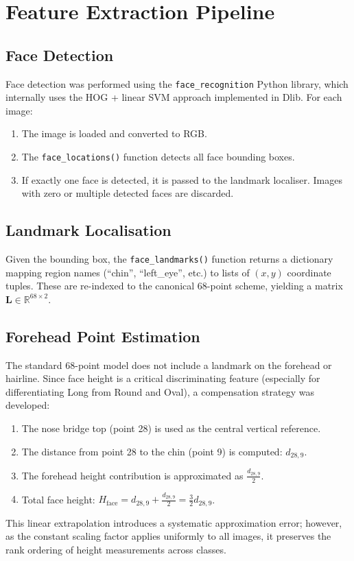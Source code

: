 \section{Feature Extraction Pipeline}
\label{sec:meth_pipeline}

\subsection{Face Detection}
Face detection was performed using the \texttt{face\_recognition} Python library, which internally uses the HOG + linear SVM approach implemented in Dlib. For each image:
\begin{enumerate}
    \item The image is loaded and converted to RGB.
    \item The \texttt{face\_locations()} function detects all face bounding boxes.
    \item If exactly one face is detected, it is passed to the landmark localiser. Images with zero or multiple detected faces are discarded.
\end{enumerate}

\subsection{Landmark Localisation}
Given the bounding box, the \texttt{face\_landmarks()} function returns a dictionary mapping region names (``chin'', ``left\_eye'', etc.) to lists of $(x, y)$ coordinate tuples. These are re-indexed to the canonical 68-point scheme, yielding a matrix $\mathbf{L} \in \mathbb{R}^{68 \times 2}$.

\subsection{Forehead Point Estimation}
The standard 68-point model does not include a landmark on the forehead or hairline. Since face height is a critical discriminating feature (especially for differentiating Long from Round and Oval), a compensation strategy was developed:
\begin{enumerate}
    \item The nose bridge top (point 28) is used as the central vertical reference.
    \item The distance from point 28 to the chin (point 9) is computed: $d_{28,9}$.
    \item The forehead height contribution is approximated as $\frac{d_{28,9}}{2}$.
    \item Total face height: $H_{\text{face}} = d_{28,9} + \frac{d_{28,9}}{2} = \frac{3}{2} d_{28,9}$.
\end{enumerate}
This linear extrapolation introduces a systematic approximation error; however, as the constant scaling factor applies uniformly to all images, it preserves the rank ordering of height measurements across classes.


